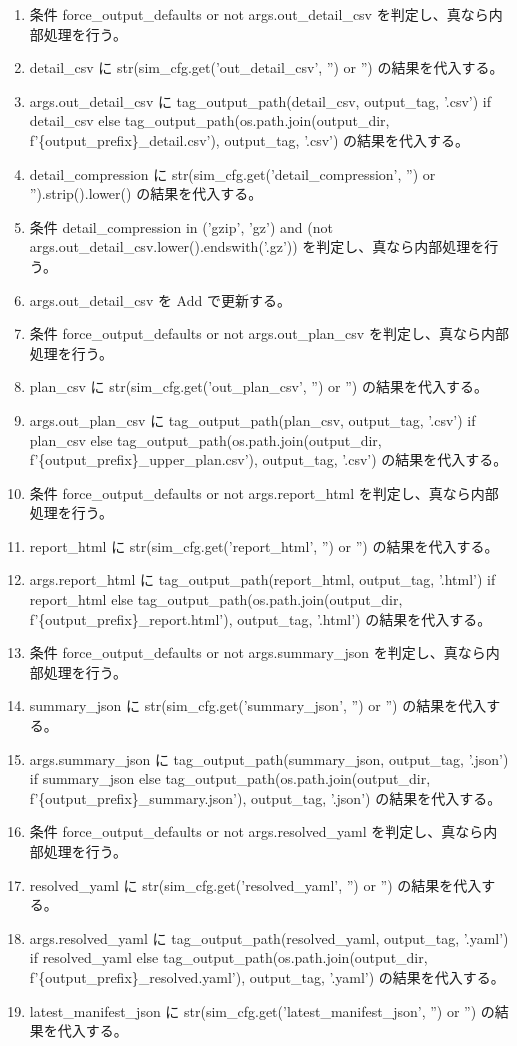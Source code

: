 \documentclass[a4paper,11pt]{article}
\begin{document}
\begin{enumerate}[leftmargin=1.8em]
\item 条件 force\_output\_defaults or not args.out\_detail\_csv を判定し、真なら内部処理を行う。
\item   detail\_csv に str(sim\_cfg.get('out\_detail\_csv', '') or '') の結果を代入する。
\item   args.out\_detail\_csv に tag\_output\_path(detail\_csv, output\_tag, '.csv') if detail\_csv else tag\_output\_path(os.path.join(output\_dir, f'\{output\_prefix\}\_detail.csv'), output\_tag, '.csv') の結果を代入する。
\item detail\_compression に str(sim\_cfg.get('detail\_compression', '') or '').strip().lower() の結果を代入する。
\item 条件 detail\_compression in ('gzip', 'gz') and (not args.out\_detail\_csv.lower().endswith('.gz')) を判定し、真なら内部処理を行う。
\item   args.out\_detail\_csv を Add で更新する。
\item 条件 force\_output\_defaults or not args.out\_plan\_csv を判定し、真なら内部処理を行う。
\item   plan\_csv に str(sim\_cfg.get('out\_plan\_csv', '') or '') の結果を代入する。
\item   args.out\_plan\_csv に tag\_output\_path(plan\_csv, output\_tag, '.csv') if plan\_csv else tag\_output\_path(os.path.join(output\_dir, f'\{output\_prefix\}\_upper\_plan.csv'), output\_tag, '.csv') の結果を代入する。
\item 条件 force\_output\_defaults or not args.report\_html を判定し、真なら内部処理を行う。
\item   report\_html に str(sim\_cfg.get('report\_html', '') or '') の結果を代入する。
\item   args.report\_html に tag\_output\_path(report\_html, output\_tag, '.html') if report\_html else tag\_output\_path(os.path.join(output\_dir, f'\{output\_prefix\}\_report.html'), output\_tag, '.html') の結果を代入する。
\item 条件 force\_output\_defaults or not args.summary\_json を判定し、真なら内部処理を行う。
\item   summary\_json に str(sim\_cfg.get('summary\_json', '') or '') の結果を代入する。
\item   args.summary\_json に tag\_output\_path(summary\_json, output\_tag, '.json') if summary\_json else tag\_output\_path(os.path.join(output\_dir, f'\{output\_prefix\}\_summary.json'), output\_tag, '.json') の結果を代入する。
\item 条件 force\_output\_defaults or not args.resolved\_yaml を判定し、真なら内部処理を行う。
\item   resolved\_yaml に str(sim\_cfg.get('resolved\_yaml', '') or '') の結果を代入する。
\item   args.resolved\_yaml に tag\_output\_path(resolved\_yaml, output\_tag, '.yaml') if resolved\_yaml else tag\_output\_path(os.path.join(output\_dir, f'\{output\_prefix\}\_resolved.yaml'), output\_tag, '.yaml') の結果を代入する。
\item latest\_manifest\_json に str(sim\_cfg.get('latest\_manifest\_json', '') or '') の結果を代入する。
            \end{enumerate}
\end{document}
